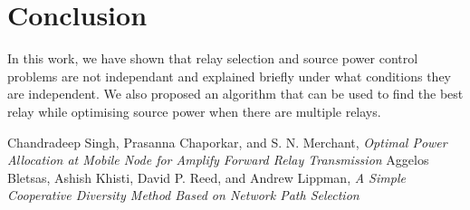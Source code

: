 \documentclass[conference]{IEEEtran}
\begin{document}
\section{Conclusion}
In this work, we have shown that relay selection and source power control problems
are not independant and explained briefly under what conditions they are independent.
We also proposed an algorithm that can be used to find the best relay while 
optimising source power when there are multiple relays. 










%
\begin{thebibliography}{1}

	\bibitem{} Chandradeep Singh, Prasanna Chaporkar, and S. N.
		Merchant, \emph{Optimal Power Allocation at Mobile Node for Amplify
		Forward Relay Transmission}
	\bibitem{} Aggelos Bletsas, Ashish Khisti, David P. Reed, and 
		Andrew Lippman, \emph{A Simple Cooperative Diversity Method Based
		on Network Path Selection}
\end{thebibliography}




\end{document}
